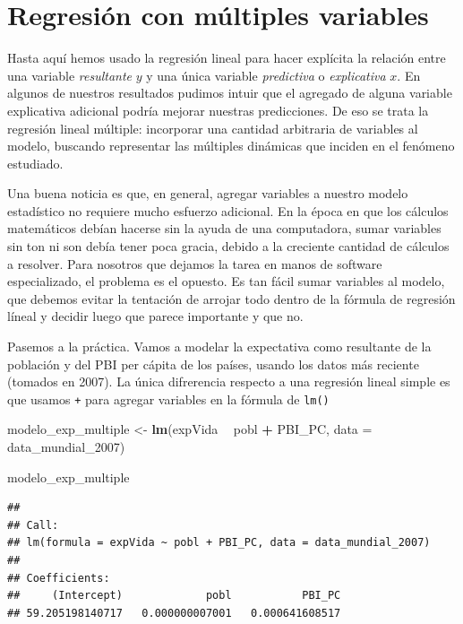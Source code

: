 \documentclass[spanish,]{book}
\newenvironment{Shaded}{\begin{snugshade}}{\end{snugshade}}
\newcommand{\DataTypeTok}[1]{\textcolor[rgb]{0.13,0.29,0.53}{#1}}
\newcommand{\DecValTok}[1]{\textcolor[rgb]{0.00,0.00,0.81}{#1}}
\newcommand{\KeywordTok}[1]{\textcolor[rgb]{0.13,0.29,0.53}{\textbf{#1}}}
\newcommand{\NormalTok}[1]{#1}
\newcommand{\OperatorTok}[1]{\textcolor[rgb]{0.81,0.36,0.00}{\textbf{#1}}}
\newcommand{\StringTok}[1]{\textcolor[rgb]{0.31,0.60,0.02}{#1}}
\begin{document}
\hypertarget{regresion-con-multiples-variables}{%
\section{Regresión con múltiples variables}\label{regresion-con-multiples-variables}}

Hasta aquí hemos usado la regresión lineal para hacer explícita la relación entre una variable \emph{resultante} \(y\) y una única variable \emph{predictiva} o \emph{explicativa} \(x\). En algunos de nuestros resultados pudimos intuir que el agregado de alguna variable explicativa adicional podría mejorar nuestras predicciones. De eso se trata la regresión lineal múltiple: incorporar una cantidad arbitraria de variables al modelo, buscando representar las múltiples dinámicas que inciden en el fenómeno estudiado.

Una buena noticia es que, en general, agregar variables a nuestro modelo estadístico no requiere mucho esfuerzo adicional. En la época en que los cálculos matemáticos debían hacerse sin la ayuda de una computadora, sumar variables sin ton ni son debía tener poca gracia, debido a la creciente cantidad de cálculos a resolver. Para nosotros que dejamos la tarea en manos de software especializado, el problema es el opuesto. Es tan fácil sumar variables al modelo, que debemos evitar la tentación de arrojar todo dentro de la fórmula de regresión líneal y decidir luego que parece importante y que no.

Pasemos a la práctica. Vamos a modelar la expectativa como resultante de la población y del PBI per cápita de los países, usando los datos más reciente (tomados en 2007). La única difrerencia respecto a una regresión lineal simple es que usamos \texttt{+} para agregar variables en la fórmula de \texttt{lm()}

\begin{Shaded}
\begin{Highlighting}[]
\NormalTok{modelo_exp_multiple <-}\StringTok{ }\KeywordTok{lm}\NormalTok{(expVida }\OperatorTok{~}\StringTok{ }\NormalTok{pobl }\OperatorTok{+}\StringTok{ }\NormalTok{PBI_PC, }\DataTypeTok{data =}\NormalTok{ data_mundial_}\DecValTok{2007}\NormalTok{)}

\NormalTok{modelo_exp_multiple}
\end{Highlighting}
\end{Shaded}

\begin{verbatim}
## 
## Call:
## lm(formula = expVida ~ pobl + PBI_PC, data = data_mundial_2007)
## 
## Coefficients:
##     (Intercept)             pobl           PBI_PC  
## 59.205198140717   0.000000007001   0.000641608517
\end{verbatim}
\end{document}
